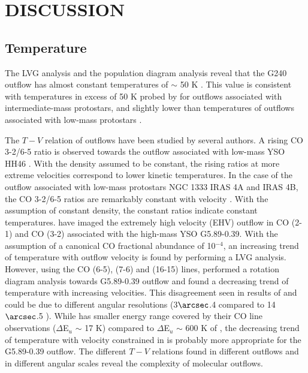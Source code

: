 \section{DISCUSSION}\label{discussion}

\subsection{Temperature}
The LVG analysis and the population diagram analysis reveal that the G240 outflow has almost constant temperatures of $\sim$ 50 K . This value is consistent with temperatures in excess of 50 K probed by \citet{2016A&A...587A..17V} for outflows associated with intermediate-mass protostars, and slightly lower than temperatures of outflows associated with low-mass protostars \citep{2009A&A...501..633V, 2012A&A...542A..86Y}.

The $T-V$ relation of outflows have been studied by several authors. A rising CO 3-2/6-5 ratio is observed towards the outflow associated with low-mass YSO HH46 \citep{2009A&A...501..633V}. With the density assumed to be constant, the rising ratios at more extreme velocities correspond to lower kinetic temperatures. In the case of the outflow associated with low-mass protostars NGC 1333 IRAS 4A and  IRAS 4B, the CO 3-2/6-5 ratios are remarkably constant with velocity \citep{2012A&A...542A..86Y}. With the assumption of constant density, the constant ratios indicate constant temperatures. \citet{2012ApJ...744L..26S} have imaged the extremely high velocity (EHV) outflow in CO (2-1) and CO (3-2) associated with the high-mass YSO G5.89-0.39. With the assumption of a canonical CO fractional abundance of 10$^{-4}$, an increasing trend of temperature with outflow velocity is found by performing a LVG analysis. However, using the CO (6-5), (7-6) and (16-15) lines, \citet{2015A&A...584A..70L} performed a rotation diagram analysis towards G5.89-0.39 outflow and found a decreasing trend of temperature with increasing velocities. This disagreement seen in results of \citet{2012ApJ...744L..26S} and \citet{2015A&A...584A..70L} could be due to different angular resolutions (3${\arcsec}$.4 compared to 14${\arcsec}$.5 ). While \citet{2012ApJ...744L..26S} has smaller energy range covered by their CO line observations ($\Delta$E$_u$ $\sim$ 17 K) compared to $\Delta$E$_u$ $\sim$ 600 K of \citet{2015A&A...584A..70L}, the decreasing trend of temperature with velocity constrained in \citet{2015A&A...584A..70L} is probably more appropriate for the G5.89-0.39 outflow. The different $T-V$ relations found in different outflows and in different angular scales reveal the complexity of molecular outflows. 

